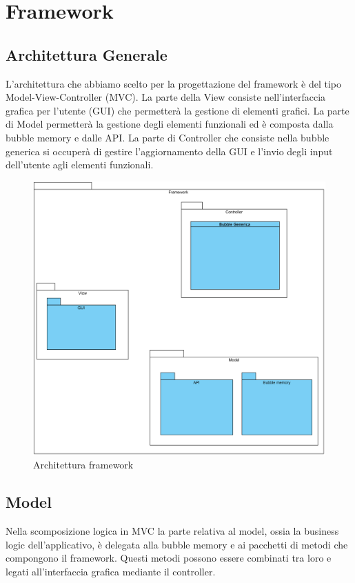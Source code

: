 \section{Framework}

\subsection{Architettura Generale}
L'architettura che abbiamo scelto per la progettazione del framework è del tipo Model-View-Controller (MVC). La parte della View consiste nell'interfaccia grafica per l'utente (GUI) che permetterà la gestione di elementi grafici. La parte di Model permetterà la gestione degli elementi funzionali ed è composta dalla bubble memory e dalle API. La parte di Controller che consiste nella bubble generica si occuperà di gestire l'aggiornamento della GUI e l'invio degli input dell'utente agli elementi funzionali.

\begin{figure}[H]
	\centering
	\includegraphics[width=14cm]{diagrammi_img/classi_e_package/framework.png}
	\caption{Architettura framework}
\end{figure}

\subsection{Model}
Nella scomposizione logica in MVC la parte relativa al model, ossia la business logic dell'applicativo, è delegata alla bubble memory e ai pacchetti di metodi che compongono il framework. Questi metodi possono essere combinati tra loro e legati all'interfaccia grafica mediante il controller.


